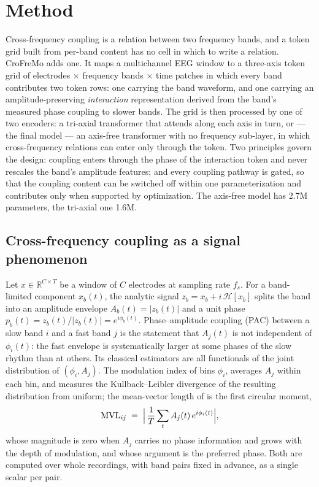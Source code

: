 \section{Method}
\label{sec:method}

Cross-frequency coupling is a relation between two frequency bands, and a
token grid built from per-band content has no cell in which to write a
relation. CroFreMo adds one. It maps a multichannel EEG window to a
three-axis token grid of electrodes $\times$ frequency bands $\times$ time
patches in which every band contributes two token rows: one carrying the
band waveform, and one carrying an amplitude-preserving \emph{interaction}
representation derived from the band's measured phase coupling to slower
bands. The grid is then processed by one of two encoders: a tri-axial transformer that attends along each axis in turn, or --- the final model --- an axis-free transformer with no frequency sub-layer, in which cross-frequency relations can enter only through the token.
Two principles govern the design: coupling enters through the phase of the
interaction token and never rescales the band's amplitude features; and
every coupling pathway is gated, so that the coupling content can be
switched off within one parameterization and contributes only when
supported by optimization. The axis-free model has
2.7M parameters, the tri-axial one 1.6M.

\subsection{Cross-frequency coupling as a signal phenomenon}
\label{sec:phenomenon}

Let $x \in \mathbb{R}^{C \times T}$ be a window of $C$ electrodes at
sampling rate $f_s$. For a band-limited component $x_b(t)$, the analytic
signal $z_b = x_b + i\,\mathcal{H}[x_b]$ splits the band into an amplitude
envelope $A_b(t) = |z_b(t)|$ and a unit phase $p_b(t) = z_b(t)/|z_b(t)|
= e^{i\phi_b(t)}$. Phase--amplitude coupling (PAC) between a slow band $i$
and a fast band $j$ is the statement that $A_j(t)$ is not independent of
$\phi_i(t)$: the fast envelope is systematically larger at some phases of
the slow rhythm than at others. Its classical estimators are all functionals
of the joint distribution of $(\phi_i, A_j)$. The modulation index of
\citet{tort2010measuring} bins $\phi_i$, averages $A_j$ within each bin, and
measures the Kullback--Leibler divergence of the resulting distribution
from uniform; the mean-vector length of \citet{canolty2006high} is the
first circular moment,
\begin{equation}
\mathrm{MVL}_{ij} \;=\; \Bigl|\,\frac{1}{T}\sum_{t} A_j(t)\,e^{i\phi_i(t)}\Bigr| ,
\label{eq:mvl-classical}
\end{equation}
whose magnitude is zero when $A_j$ carries no phase information and grows
with the depth of modulation, and whose argument is the preferred phase.
Both are computed over whole recordings, with band pairs fixed in advance,
as a single scalar per pair.

